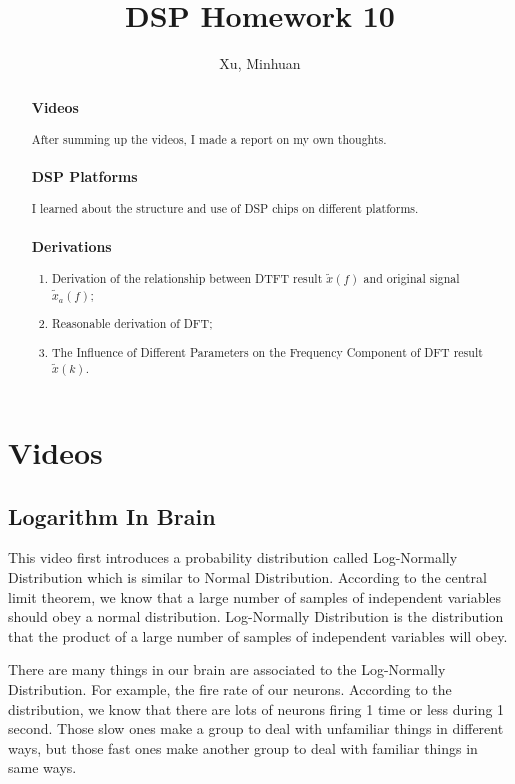 \documentclass{article}
\begin{document}
\title{DSP Homework 10}
\author{Xu, Minhuan}
\maketitle
\tableofcontents
\begin{abstract}
\subsubsection*{Videos}
After summing up the videos, I made a report on my own thoughts.
\subsubsection*{DSP Platforms}
I learned about the structure and use of DSP chips on different platforms.
\subsubsection*{Derivations}
\begin{enumerate}
	\item Derivation of the relationship between DTFT result $\widetilde{x}(f)$ and original signal $\widetilde{x}_a(f)$;
	\item Reasonable derivation of DFT;
	\item The Influence of Different Parameters on the Frequency Component of DFT result $\widetilde{x}(k)$.
\end{enumerate}
\end{abstract}

\section{Videos}
\subsection{Logarithm In Brain}
This video first introduces a probability distribution called Log-Normally Distribution which is similar to Normal Distribution. According to the central limit theorem, we know that a large number of samples of independent variables should obey a normal distribution. Log-Normally Distribution is the distribution that the product of a large number of samples of independent variables will obey.

There are many things in our brain are associated to the Log-Normally Distribution. For example, the fire rate of our neurons. According to the distribution, we know that there are lots of neurons firing 1 time or less during 1 second. Those slow ones make a group to deal with unfamiliar things in different ways, but those fast ones make another group to deal with familiar things in same ways.
\end{document}
